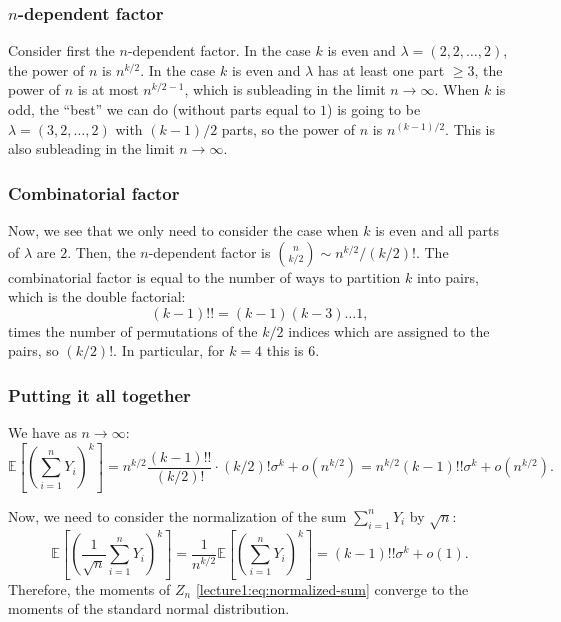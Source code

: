\documentclass[letterpaper,11pt,oneside,reqno]{book}
\numberwithin{equation}{chapter}  %
\theoremstyle{definition}
\begin{document}
\subsubsection{$n$-dependent factor}
\label{lecture1:subsub:n-dependent-factor}

Consider first the $n$-dependent factor.
In the case $k$ is even and $\lambda=(2,2,\ldots,2 )$, the power
of $n$ is $n^{k/2}$.
In the case $k$ is even and $\lambda$ has at least one
part $\ge 3$, the power of $n$ is at most $n^{k/2-1}$,
which is subleading in the limit $n\to\infty$.
When $k$ is odd, the ``best'' we can do
(without parts equal to $1$)
is going to be
$\lambda=(3,2,\ldots, 2)$ with $(k-1)/2$ parts,
so the power of $n$ is $n^{(k-1)/2}$. This is also subleading
in the limit $n\to\infty$.


\subsubsection{Combinatorial factor}

Now, we see that we only need to consider the
case when $k$ is even and all parts of $\lambda$ are $2$.
Then, the $n$-dependent factor is $\binom{n}{k/2}\sim
n^{k/2}/(k/2)!$.
The combinatorial factor is
equal to the number of ways to partition $k$ into
pairs, which is the double factorial:
\begin{equation*}
	(k-1)!!=(k-1)(k-3)\ldots 1,
\end{equation*}
times the number of permutations
of the $k/2$ indices which are assigned to the pairs,
so $(k/2)!$.
In particular, for $k=4$ this is $6$.

\subsubsection{Putting it all together}

We have as $n\to\infty$:
\begin{equation*}
	\mathbb{E}\left[ \left( \sum_{i=1}^n Y_i \right)^k \right]
	=
	n^{k/2}
	\frac{(k-1)!!}{(k/2)!}\cdot (k/2)!
	\sigma^k
	+o(n^{k/2})=
	n^{k/2}
	(k-1)!!
	\sigma^k
	+o(n^{k/2}).
\end{equation*}

Now, we need to consider the normalization of the sum
$\sum_{i=1}^n Y_i$ by $\sqrt{n}$:
\begin{equation*}
	\mathbb{E}\left[ \left( \frac{1}{\sqrt{n}} \sum_{i=1}^n Y_i \right)^k \right]
	=
	\frac{1}{n^{k/2}}
	\mathbb{E}\left[ \left( \sum_{i=1}^n Y_i \right)^k \right]
	=
	(k-1)!!
	\sigma^k
	+o(1).
\end{equation*}
Therefore, the moments of
$Z_n$ \eqref{lecture1:eq:normalized-sum}
converge to the moments of the standard normal distribution.
\end{document}
